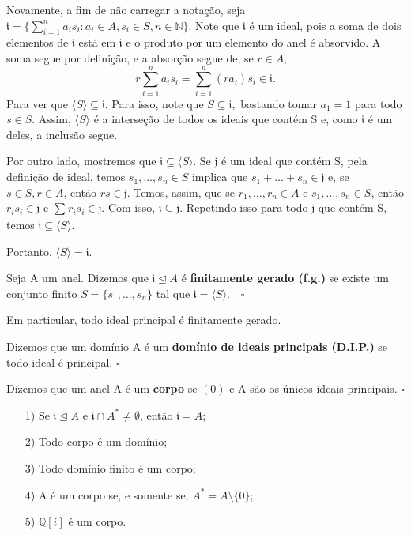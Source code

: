\documentclass[AlgebraII/algebraII_notes.tex]{subfiles}
\begin{document}
\begin{proof*}
	Novamente, a fim de não carregar a notação, seja \(\mathfrak{i} = \{\sum\limits_{i=1}^{n}a_{i}s_{i}: a_{i}\in A, s_{i}\in S, n\in \mathbb{N}\}\). Note que
	\(\mathfrak{i}\) é um ideal, pois a soma de dois elementos de \(\mathfrak{i}\) está em \(\mathfrak{i}\) e o produto por um elemento do anel é absorvido.
	A soma segue por definição, e a absorção segue de, se \(r\in A,\)
	\[
		r \sum\limits_{i=1}^{n}a_{i}s_{i} = \sum\limits_{i=1}^{n}(ra_{i})s_{i}\in \mathfrak{i}.
	\]
	Para ver que \(\langle S \rangle \subseteq{\mathfrak{i}}.\) Para isso, note que \(S\subseteq{\mathfrak{i}},\) bastando tomar \(a_{1} = 1\) para todo
	\(s\in S\). Assim, \(\langle S \rangle\) é a interseção de todos os ideais que contém S e, como \(\mathfrak{i}\) é um deles, a inclusão segue.

	Por outro lado, mostremos que \(\mathfrak{i}\subseteq{\langle S \rangle}.\) Se \(\mathfrak{j}\) é um ideal que contém S, pela definição de ideal,
	temos \(s_{1}, \dotsc, s_{n}\in S\) implica que \(s_{1} + \dotsc + s_{n}\in \mathfrak{j}\) e, se \(s\in S, r\in A\), então \(rs\in \mathfrak{j}.\)
	Temos, assim, que se \(r_{1}, \dotsc, r_{n}\in A\) e \(s_{1}, \dotsc, s_{n}\in S\), então \(r_{i}s_{i}\in \mathfrak{j}\) e \(\sum\limits_{}^{}r_{i}s_{i}\in \mathfrak{j}.\)
	Com isso, \(\mathfrak{i}\subseteq{\mathfrak{j}}.\) Repetindo isso para todo \(\mathfrak{j}\) que contém S, temos \(\mathfrak{i}\subseteq{\langle S \rangle}.\)

	Portanto, \(\langle S \rangle = \mathfrak{i}.\) \qedsymbol
\end{proof*}
\begin{def*}
	Seja A um anel. Dizemos que \(\mathfrak{i} \trianglelefteq{A}\) é \textbf{finitamente gerado (f.g.)} se existe um conjunto finito
	\(S = \{s_{1}, \dotsc, s_{n}\}\) tal que \(\mathfrak{i} = \langle S \rangle.\quad\square\)
\end{def*}
Em particular, todo ideal principal é finitamente gerado.
\begin{def*}
	Dizemos que um domínio A é um \textbf{domínio de ideais principais (D.I.P.)} se todo ideal é principal. \(\square\)
\end{def*}
\begin{def*}
	Dizemos que um anel A é um \textbf{corpo} se \((0)\) e A são os únicos ideais principais. \(\square\)
\end{def*}
\begin{example}[Exercício]
	\begin{itemize}
		\item[1)] Se \(\mathfrak{i}\trianglelefteq{A}\) e \(\mathfrak{i}\cap A^{*}\neq\emptyset\), então \(\mathfrak{i} = A\);
		\item[2)] Todo corpo é um domínio;
		\item[3)] Todo domínio finito é um corpo;
		\item[4)] A é um corpo se, e somente se, \(A^{*} = A \setminus{\{0\}}\);
		\item[5)] \(\mathbb{Q}[i]\) é um corpo.
	\end{itemize}
\end{example}
\end{document}
